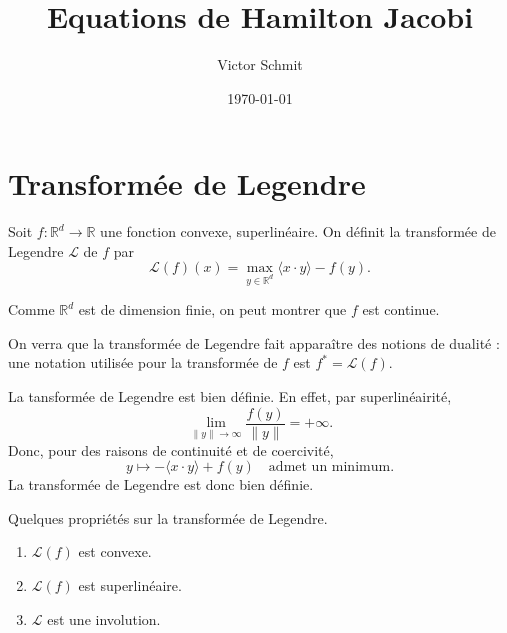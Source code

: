 \documentclass[10pt]{article}
\title{Equations de Hamilton Jacobi}
\author{Victor Schmit}
\date{\today}
\newcommand{\R}{\mathbb{R}}
\newcommand{\aL}{\mathcal{L}}
\begin{document}
\maketitle

\tableofcontents
\newpage

\section{Transformée de Legendre}

Soit $f : \R^d  \to \R$ une fonction convexe, superlinéaire. On définit la transformée
de Legendre $\aL$ de $f$ par
\[
	\aL(f) (x) = \max_{y \in \R^d} \langle x \cdot y\rangle - f(y).
\]

\rem Comme $\R^d$ est de dimension finie, on peut montrer que $f$ est continue.

\rem On verra que la transformée de Legendre fait apparaître des notions de dualité :
une notation utilisée pour la transformée de $f$ est $f^* = \aL(f)$.

\rem La tansformée de Legendre est bien définie. En effet, par superlinéairité,
\[
	\lim_{\|y\| \to \infty} \frac{f(y)}{\|y\|} = + \infty.
\]
Donc, pour des raisons de continuité et de coercivité,
\[
	y \mapsto - \langle x \cdot y \rangle + f(y) \quad \text{admet un minimum.}
\]
La transformée de Legendre est donc bien définie.

\prop Quelques propriétés sur la transformée de Legendre.
\begin{enumerate}
	\item $\aL(f)$ est convexe.

	\item $\aL(f)$ est superlinéaire.

	\item $\aL$ est une involution.
\end{enumerate}
\end{document}
